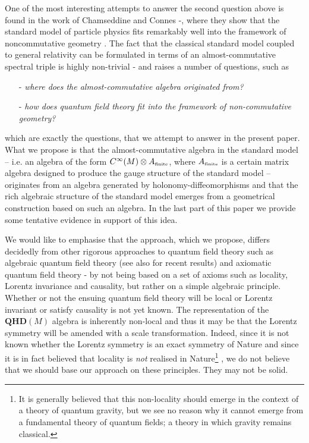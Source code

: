 \documentclass[letterpaper,11pt]{article}
\begin{document}
One of the most interesting attempts to answer the second question above is found in the work of Chamseddine and Connes \cite{Connes:1996gi}-\cite{Chamseddine:2012sw}, where they show that the standard model of particle physics fits remarkably well into the framework of noncommutative geometry \cite{ConnesBook,1414300}. The fact that the classical standard model coupled to general relativity can be formulated in terms of an almost-commutative spectral triple is highly non-trivial \cite{Krajewski:1996se}-\cite{Jureit:2009ye} and raises a number of questions, such as
\begin{itemize}
\item[-]
{\it where does the almost-commutative algebra originated from?}
\item[-]
{\it how does quantum field theory fit into the framework of non-commutative geometry?}
\end{itemize}
which are exactly the questions, that we attempt to answer in the present paper. What we propose is that the almost-commutative algebra in the standard model -- i.e. an algebra of the form $C^\infty(M)\otimes A_{\mbox{\tiny finite}}$, where $A_{\mbox{\tiny finite}}$ is a certain matrix algebra designed to produce the gauge structure of the standard model -- originates from an algebra generated by holonomy-diffeomorphisms and that the rich algebraic structure of the standard model emerges from a geometrical construction based on such an algebra. In the last part of this paper we provide some tentative evidence in support of this idea.





We would like to emphasise that the approach, which we propose, differs decidedly from other rigorous approaches to quantum field theory such as algebraic quantum field theory \cite{Bogo,Brunetti} (see also \cite{Buchholz} for recent results) and axiomatic quantum field theory \cite{Osterwalder:1973dx}-\cite{Haag:1992hx} by not being based on a set of axioms such as locality, Lorentz invariance and causality, but rather on a simple algebraic principle. Whether or not the ensuing quantum field theory will be local or Lorentz invariant or satisfy causality is not yet known. The representation of the ${\mathbf{QHD}}(M)$ algebra is inherently non-local \cite{Aastrup:2019yui,Aastrup:2017vrm} and thus it may be that the Lorentz symmetry will be amended with a scale transformation. Indeed, since it is not known whether the Lorentz symmetry is an exact symmetry of Nature \cite{Jacobson:2004rj} and since it is in fact believed that locality is {\it not} realised in Nature\footnote{It is generally believed that this non-locality should emerge in the context of a theory of quantum gravity, but we see no reason why it cannot emerge from a fundamental theory of quantum fields; a theory in which gravity remains classical.} \cite{Doplicher:1994tu}, we do not believe that we should base our approach on these principles. They may not be solid.
\end{document}
